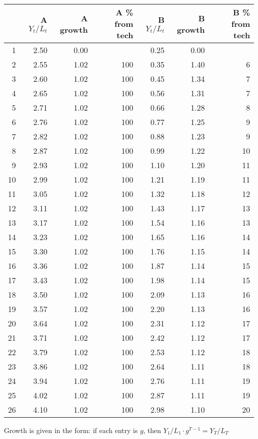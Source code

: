 \documentclass[12pt,letterpaper]{article}
\theoremstyle{definition}
\begin{document}
\begin{table}[p]
\centering
\begin{tabular}{rrrrrrr}
  \hline
 & A $Y_t/L_t$ & A growth & A \% from tech & B $Y_t/L_t$ & B growth & B \% from tech \\ 
  \hline
1 & 2.50 & 0.00 &  & 0.25 & 0.00 &  \\ 
  2 & 2.55 & 1.02 & 100 & 0.35 & 1.40 & 6 \\ 
  3 & 2.60 & 1.02 & 100 & 0.45 & 1.34 & 7 \\ 
  4 & 2.65 & 1.02 & 100 & 0.56 & 1.31 & 7 \\ 
  5 & 2.71 & 1.02 & 100 & 0.66 & 1.28 & 8 \\ 
  6 & 2.76 & 1.02 & 100 & 0.77 & 1.25 & 9 \\ 
  7 & 2.82 & 1.02 & 100 & 0.88 & 1.23 & 9 \\ 
  8 & 2.87 & 1.02 & 100 & 0.99 & 1.22 & 10 \\ 
  9 & 2.93 & 1.02 & 100 & 1.10 & 1.20 & 11 \\ 
  10 & 2.99 & 1.02 & 100 & 1.21 & 1.19 & 11 \\ 
  11 & 3.05 & 1.02 & 100 & 1.32 & 1.18 & 12 \\ 
  12 & 3.11 & 1.02 & 100 & 1.43 & 1.17 & 13 \\ 
  13 & 3.17 & 1.02 & 100 & 1.54 & 1.16 & 13 \\ 
  14 & 3.23 & 1.02 & 100 & 1.65 & 1.16 & 14 \\ 
  15 & 3.30 & 1.02 & 100 & 1.76 & 1.15 & 14 \\ 
  16 & 3.36 & 1.02 & 100 & 1.87 & 1.14 & 15 \\ 
  17 & 3.43 & 1.02 & 100 & 1.98 & 1.14 & 15 \\ 
  18 & 3.50 & 1.02 & 100 & 2.09 & 1.13 & 16 \\ 
  19 & 3.57 & 1.02 & 100 & 2.20 & 1.13 & 16 \\ 
  20 & 3.64 & 1.02 & 100 & 2.31 & 1.12 & 17 \\ 
  21 & 3.71 & 1.02 & 100 & 2.42 & 1.12 & 17 \\ 
  22 & 3.79 & 1.02 & 100 & 2.53 & 1.12 & 18 \\ 
  23 & 3.86 & 1.02 & 100 & 2.64 & 1.11 & 18 \\ 
  24 & 3.94 & 1.02 & 100 & 2.76 & 1.11 & 19 \\ 
  25 & 4.02 & 1.02 & 100 & 2.87 & 1.11 & 19 \\ 
  26 & 4.10 & 1.02 & 100 & 2.98 & 1.10 & 20 \\ 
   \hline
\end{tabular}
\end{table}

Growth is given in the form: if each entry is $g$, then $Y_1/L_1 \cdot g^{T - 1}
= Y_T/L_T$
\end{document}
